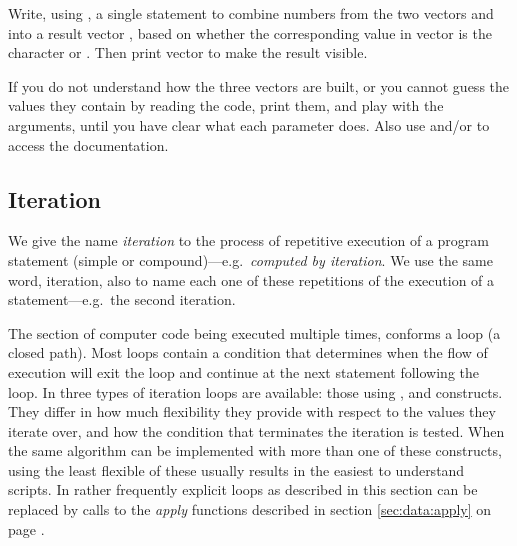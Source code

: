 \documentclass[krantz2]{krantz}\usepackage{knitr}%
\begin{document}
\begin{playground}
Write, using , a single statement to combine numbers from the two vectors  and  into a result vector , based on whether the corresponding value in vector  is the character  or . Then print vector  to make the result visible.

\begin{knitrout}\footnotesize
{}\color{fgcolor}\begin{kframe}
\begin{alltt}
 \hlkwb{<-} \hlopt{-}\hlopt{:-}
 \hlkwb{<-} \hlopt{+}\hlopt{:}
 \hlkwb{<-} \hlstd{(}\hlstd{(}\hlstd{,} \hlstd{),} \hlstd{(}\hlstd{,} \hlstd{))}
\end{alltt}
\end{kframe}
\end{knitrout}

If you do not understand how the three vectors are built, or you cannot guess the values they contain by reading the code, print them, and play with the arguments, until you have clear what each parameter does. Also use  and/or  to access the documentation.
\end{playground}

\subsection{Iteration}
We give the name \emph{iteration} to the process of repetitive execution of a program statement (simple or compound)---e.g.\ \emph{computed by iteration}. We use the same word, iteration, also to name each one of these repetitions of the execution of a statement---e.g.\ the second iteration.

The section of computer code being executed multiple times, conforms a loop (a closed path). Most loops contain a condition that determines when the flow of execution will exit the loop and continue at the next statement following the loop. In \Rlang three types of iteration loops are available: those using ,  and  constructs. They differ in how much flexibility they provide with respect to the values they iterate over, and how the condition that terminates the iteration is tested. When the same algorithm can be implemented with more than one of these constructs, using the least flexible of these usually results in the easiest to understand \Rlang scripts. In \Rlang rather frequently explicit loops as described in this section can be replaced by calls to the \emph{apply} functions described in section \ref{sec:data:apply} on page \pageref{sec:data:apply}.
\end{document}
